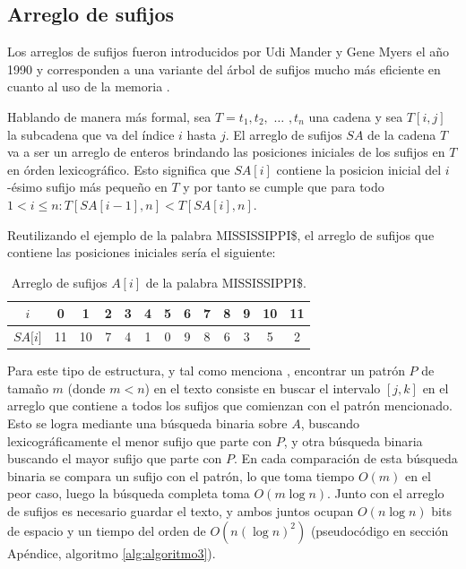 \subsection{Arreglo de sufijos}

Los arreglos de sufijos fueron introducidos por Udi Mander y Gene Myers el año 1990 \cite{suffixarray1} y corresponden a una variante del árbol de sufijos mucho más eficiente en cuanto al uso de la memoria \cite{licenciado}. 

Hablando de manera más formal, sea $T=t_{1}, t_{2},$ $\ldots$ $,t_{n}$ una cadena y sea $T[i,j]$ la subcadena que va del índice $i$ hasta $j$. El arreglo de sufijos $SA$ de la cadena $T$ va a ser un arreglo de enteros brindando las posiciones iniciales de los sufijos en $T$ en órden lexicográfico. Esto significa que $SA[i]$ contiene la posicion inicial del $i$-ésimo sufijo más pequeño en $T$ y por tanto se cumple que para todo $1 < i \leq n: T[SA[i-1],n] < T[SA[i],n]$. 

Reutilizando el ejemplo de la palabra MISSISSIPPI\$, el arreglo de sufijos que contiene las posiciones iniciales sería el siguiente:

\begin{table}[h]
\centering
\label{my-label9}
\begin{tabular}{|
>{\columncolor[HTML]{EFEFEF}}c|c|c|c|c|c|c|c|c|c|c|c|c|}
\hline
$i$        & 0  & 1  & 2 & 3 & 4 & 5 & 6 & 7 & 8 & 9 & 10 & 11 \\ \hline
$SA{[}i{]}$ & 11 & 10 & 7 & 4 & 1 & 0 & 9 & 8 & 6 & 3 & 5  & 2  \\ \hline
\end{tabular}
\caption{Arreglo de sufijos $A[i]$ de la palabra MISSISSIPPI\$.}
\end{table} 

Para este tipo de estructura, y tal como menciona \cite{abeliuk}, encontrar un patrón $P$ de tamaño $m$ (donde $m < n$) en el texto consiste en buscar el intervalo $[j,k]$ en el arreglo que contiene a todos los sufijos que comienzan con el patrón mencionado. Esto se logra mediante una búsqueda binaria sobre $A$, buscando lexicográficamente el menor sufijo que parte con $P$, y otra búsqueda binaria buscando el mayor sufijo que parte con $P$. En cada comparación de esta búsqueda binaria se compara un sufijo con el patrón, lo que toma tiempo $O(m)$ en el peor caso, luego la búsqueda completa toma $O(m \log n)$. Junto con el arreglo de sufijos es necesario guardar el texto, y ambos juntos ocupan $O(n \log n)$ bits de espacio y un tiempo del orden de $O(n (\log n)^{2})$ \cite{suffixarray2} (pseudocódigo en sección Apéndice, algoritmo \ref{alg:algoritmo3}).

